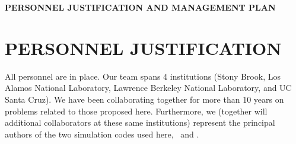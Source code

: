 \documentclass[11pt,letterpaper,english]{article}
\begin{document}


\pagestyle{fancy} 
 \renewcommand{%
\headrulewidth}{0.0pt}

\begin{center}
\bf {PERSONNEL JUSTIFICATION AND MANAGEMENT PLAN} 
\end{center}


\section{PERSONNEL JUSTIFICATION}


All personnel are in place.  Our team spans 4 institutions (Stony
Brook, Los Alamos National Laboratory, Lawrence Berkeley National
Laboratory, and UC Santa Cruz).  We have been collaborating together
for more than 10 years on problems related to those proposed here.
Furthermore, we (together will additional collaborators at these same
institutions) represent the principal authors of the two simulation
codes used here, \maestro\ and \castro.
\end{document}
